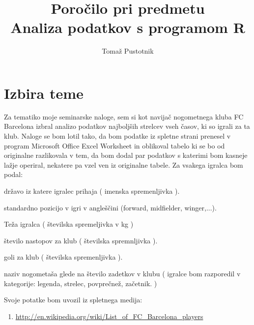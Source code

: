 \documentclass[11pt,a4paper]{article}
\begin{document}
\title{Poročilo pri predmetu \\
Analiza podatkov s programom R}
\author{Tomaž Pustotnik}
\maketitle

\section{Izbira teme}

Za tematiko moje seminarske naloge, sem si kot navijač nogometnega kluba FC Barcelona izbral analizo podatkov najboljših strelcev vseh časov, ki so igrali za ta klub. Naloge se bom lotil tako, da bom podatke iz spletne strani prenesel v program Microsoft Office Excel Worksheet in oblikoval tabelo ki se bo od originalne razlikovala v tem, da bom dodal par podatkov s katerimi bom kasneje lažje operiral, nekatere pa vzel ven iz originalne tabele. Za vsakega igralca bom podal:
\itemize
\item državo iz katere igralec prihaja ( imenska spremenljivka ).

\item standardno pozicijo v igri v angleščini (forward, midfielder, winger,...).

\item Teža igralca ( številska spremeljivka v kg )

\item število nastopov za klub ( številska spremnljivka ).

\item goli za klub ( številska spremenljivka ).

\item naziv nogometaša glede na število zadetkov v klubu ( igralce bom razporedil v kategorije: legenda, strelec, povprečnež, začetnik. )

Svoje potatke bom uvozil iz spletnega medija: 


\begin{enumerate}
\item{\url{http://en.wikipedia.org/wiki/List_of_FC_Barcelona_players
}}
\end{enumerate}
\end{document}
